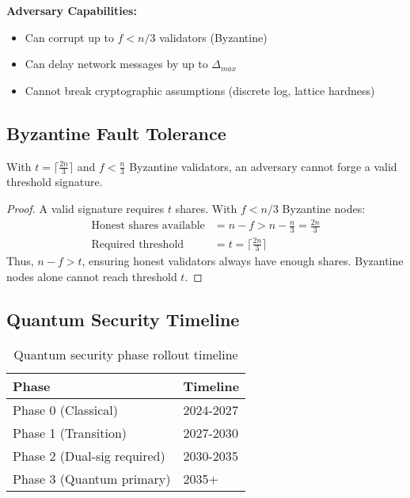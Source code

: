 \documentclass[11pt]{article}
\begin{document}
\textbf{Adversary Capabilities:}
\begin{itemize}
\item Can corrupt up to $f < n/3$ validators (Byzantine)
\item Can delay network messages by up to $\Delta_{max}$
\item Cannot break cryptographic assumptions (discrete log, lattice hardness)
\end{itemize}

\subsection{Byzantine Fault Tolerance}

\begin{theorem}
With $t = \lceil \frac{2n}{3} \rceil$ and $f < \frac{n}{3}$ Byzantine validators, an adversary cannot forge a valid threshold signature.
\end{theorem}

\begin{proof}
A valid signature requires $t$ shares. With $f < n/3$ Byzantine nodes:
\begin{align}
\text{Honest shares available} &= n - f > n - \frac{n}{3} = \frac{2n}{3} \\
\text{Required threshold} &= t = \lceil \frac{2n}{3} \rceil
\end{align}
Thus, $n - f > t$, ensuring honest validators always have enough shares. Byzantine nodes alone cannot reach threshold $t$.
\end{proof}

\subsection{Quantum Security Timeline}

\begin{table}[h]
\centering
\begin{tabular}{@{}ll@{}}
\toprule
\textbf{Phase} & \textbf{Timeline} \\
\midrule
Phase 0 (Classical) & 2024-2027 \\
Phase 1 (Transition) & 2027-2030 \\
Phase 2 (Dual-sig required) & 2030-2035 \\
Phase 3 (Quantum primary) & 2035+ \\
\bottomrule
\end{tabular}
\caption{Quantum security phase rollout timeline}
\label{tab:quantum-timeline}
\end{table}
\end{document}

